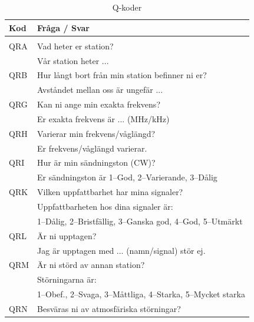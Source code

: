 \begin{longtable}{ll}
	\textbf{Kod} & \textbf{Fråga / Svar}                                                         \\ \hline 
	\endhead
	\caption{Q-koder}\\    
\endlastfoot
	QRA & Vad heter er station?                                                \\
	    & Vår station heter ...                                                \\ \hline
	QRB & Hur långt bort från min station befinner ni er?                      \\
	    & Avståndet mellan oss är ungefär ...                                  \\ \hline
	QRG & Kan ni ange min exakta frekvens?                                     \\
	    & Er exakta frekvens är ... (MHz/kHz)                                  \\ \hline
	QRH & Varierar min frekvens/våglängd?                                      \\
	    & Er frekvens/våglängd varierar.                                       \\ \hline
	QRI & Hur är min sändningston (CW)?                                        \\
	    & Er sändningston är 1--God, 2--Varierande, 3--Dålig                   \\ \hline
	QRK & Vilken uppfattbarhet har mina signaler?                              \\
	    & Uppfattbarheten hos dina signaler är:                                \\
	    & 1--Dålig, 2--Bristfällig, 3--Ganska god, 4--God, 5--Utmärkt          \\ \hline
	QRL & Är ni upptagen?                                                      \\
	    & Jag är upptagen med ... (namn/signal) stör ej.                       \\ \hline
	QRM & Är ni störd av annan station?                                        \\
	    & Störningarna är:                                                     \\
	    & 1--Obef., 2--Svaga, 3--Måttliga, 4--Starka, 5--Mycket starka         \\ \hline
	QRN & Besväras ni av atmosfäriska störningar?                              \\

\end{longtable}
